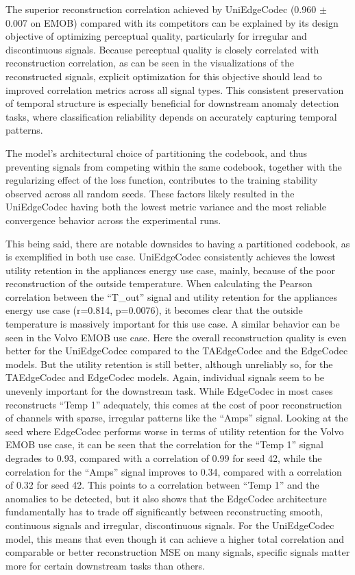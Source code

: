 The superior reconstruction correlation achieved by UniEdgeCodec (0.960 $\pm$ 0.007 on EMOB) compared with its competitors can be explained by its design objective of optimizing perceptual quality, particularly for irregular and discontinuous signals. Because perceptual quality is closely correlated with reconstruction correlation, as can be seen in the visualizations of the reconstructed signals, explicit optimization for this objective should lead to improved correlation metrics across all signal types. This consistent preservation of temporal structure is especially beneficial for downstream anomaly detection tasks, where classification reliability depends on accurately capturing temporal patterns. 

The model's architectural choice of partitioning the codebook, and thus preventing signals from competing within the same codebook, together with the regularizing effect of the loss function, contributes to the training stability observed across all random seeds. These factors likely resulted in the UniEdgeCodec having both the lowest metric variance and the most reliable convergence behavior across the experimental runs. 

This being said, there are notable downsides to having a partitioned codebook, as is exemplified in both use case. UniEdgeCodec consistently achieves the lowest utility retention in the appliances energy use case, mainly, because of the poor reconstruction of the outside temperature. When calculating the Pearson correlation between the ``T\_out'' signal and utility retention for the appliances energy use case (r=0.814, p=0.0076), it becomes clear that the outside temperature is massively important for this use case. A similar behavior can be seen in the Volvo EMOB use case. Here the overall reconstruction quality is even better for the UniEdgeCodec compared to the TAEdgeCodec and the EdgeCodec models. But the utility retention is still better, although unreliably so, for the TAEdgeCodec and EdgeCodec models. Again, individual signals seem to be unevenly important for the downstream task. While EdgeCodec in most cases reconstructs ``Temp 1'' adequately, this comes at the cost of poor reconstruction of channels with sparse, irregular patterns like the ``Amps'' signal. Looking at the seed where EdgeCodec performs worse in terms of utility retention for the Volvo EMOB use case, it can be seen that the correlation for the ``Temp 1'' signal degrades to 0.93, compared with a correlation of 0.99 for seed 42, while the correlation for the ``Amps'' signal improves to 0.34, compared with a correlation of 0.32 for seed 42. This points to a correlation between ``Temp 1'' and the anomalies to be detected, but it also shows that the EdgeCodec architecture fundamentally has to trade off significantly between reconstructing smooth, continuous signals and irregular, discontinuous signals. For the UniEdgeCodec model, this means that even though it can achieve a higher total correlation and comparable or better reconstruction MSE on many signals, specific signals matter more for certain downstream tasks than others.

